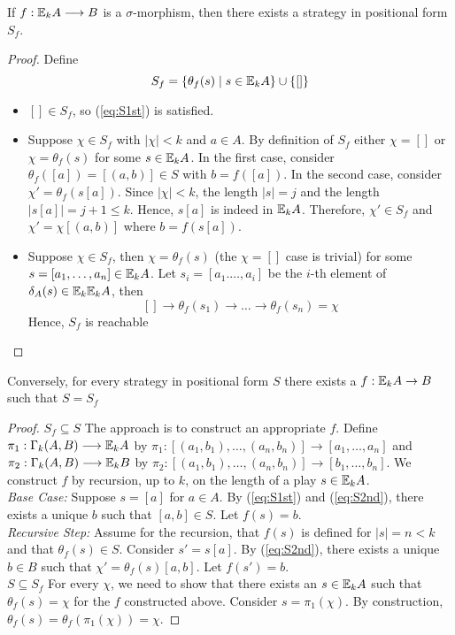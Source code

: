 \begin{prop}
If $f:{\mathbb{E}_{k}A} \longrightarrow B$ is a $\sigma$-morphism, then there exists a strategy in positional form $S_{f}$.
\begin{proof}
Define
$$S_{f} = \{\theta_{f}(s) \mid s \in {\mathbb{E}_{k}A}\} \cup \{[]\}$$
\begin{itemize}
\item $[] \in S_{f}$, so (\ref{eq:S1st}) is satisfied.
\item Suppose $\chi \in S_{f}$ with $|\chi| < k$ and $a \in A$. By definition of $S_{f}$ either $\chi = []$ or $\chi = \theta_{f}(s)$ for some $s \in {\mathbb{E}_{k}A}$. In the first case, consider $\theta_{f}([a]) = [(a,b)] \in S$ with $b = f([a])$. In the second case, consider $\chi' = \theta_{f}(s[a])$. Since $|\chi| < k$, the length $|s| = j$ and the length $|s[a]| = j+1 \leq k$. Hence, $s[a]$ is indeed in ${\mathbb{E}_{k}A}$. Therefore, $\chi' \in S_{f}$ and $\chi' = \chi[(a,b)]$ where $b = f(s[a])$.  
\item Suppose $\chi \in S_{f}$, then $\chi = \theta_{f}(s)$ (the $\chi = []$ case is trivial) for some $s = [a_{1},\dots,a_{n}] \in {\mathbb{E}_{k}A}$. Let $s_{i} = [a_{1}.\dots,a_{i}]$ be the $i$-th element of $\delta_{A}(s) \in {\mathbb{E}_{k}{\mathbb{E}_{k}A}}$, then
$$ [] \longrightarrow \theta_{f}(s_{1}) \longrightarrow \dots \longrightarrow \theta_{f}(s_{n}) = \chi$$
Hence, $S_{f}$ is reachable
\end{itemize}
\end{proof}
\label{prop:fToPosFormEF}
\end{prop}
\begin{prop}
Conversely, for every strategy in positional form $S$ there exists a $f:{\mathbb{E}_{k}A} \rightarrow B$ such that $S = S_{f}$
\begin{proof}
$S_{f} \subseteq S$ The approach is to construct an appropriate $f$. Define $\pi_{1}:\Gamma_{k}(A,B) \longrightarrow {\mathbb{E}_{k}A}$ by $\pi_{1}:[(a_{1},b_{1}),\dots,(a_{n},b_{n})] \longrightarrow [a_{1},\dots,a_{n}]$ and $\pi_{2}:\Gamma_{k}(A,B) \longrightarrow {\mathbb{E}_{k}B}$ by $\pi_{2}:[(a_{1},b_{1}),\dots,(a_{n},b_{n})] \longrightarrow [b_{1},\dots,b_{n}]$. We construct $f$ by recursion, up to $k$, on the length of a play $s \in {\mathbb{E}_{k}A}$. \\ 
\textit{Base Case:} Suppose $s = [a]$ for $a \in A$. By (\ref{eq:S1st}) and (\ref{eq:S2nd}), there exists a unique $b$ such that $[a,b] \in S$. Let $f(s) = b$. \\    
\textit{Recursive Step:} Assume for the recursion, that $f(s)$ is defined for $|s| = n < k$ and that $\theta_{f}(s) \in S$. Consider $s' = s[a]$. By (\ref{eq:S2nd}), there exists a unique $b \in B$ such that $\chi' = \theta_{f}(s)[a,b]$. Let $f(s') = b$. \\      
$S \subseteq S_{f}$ For every $\chi$, we need to show that there exists an $s \in {\mathbb{E}_{k}A}$ such that $\theta_{f}(s) = \chi$ for the $f$ constructed above. Consider $s = \pi_{1}(\chi)$. By construction, $\theta_{f}(s) = \theta_{f}(\pi_{1}(\chi)) = \chi$.
\end{proof}
\label{prop:posFormToFEF}
\end{prop}
